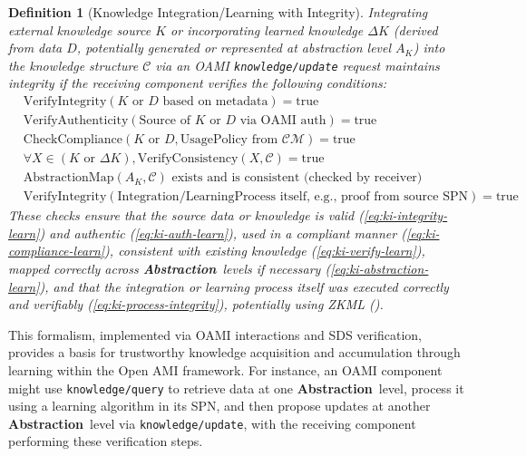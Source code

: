 \documentclass[12pt,a4paper]{report}
\renewcommand{\citep}[1]{\textit{\scriptsize{(\cite{#1})}}}
\newtheorem{definition}{Definition}[section]
\newcommand{\Abstraction}{\textbf{Abstraction}}
\begin{document}
	\begin{definition}[Knowledge Integration/Learning with Integrity]
		\label{def:knowledge_integration}
		Integrating external knowledge source $K$ or incorporating learned knowledge $\Delta K$ (derived from data $D$, potentially generated or represented at abstraction level $A_K$) into the knowledge structure $\mathcal{C}$ via an OAMI \texttt{knowledge/update} request maintains integrity if the receiving component verifies the following conditions:
		\begin{align}
			&\text{VerifyIntegrity}(K \text{ or } D \text{ based on metadata}) = \text{true} \label{eq:ki-integrity-learn}\\
			&\text{VerifyAuthenticity}(\text{Source of } K \text{ or } D \text{ via OAMI auth}) = \text{true} \label{eq:ki-auth-learn}\\
			&\text{CheckCompliance}(K \text{ or } D, \text{UsagePolicy from } \mathcal{CM}) = \text{true} \label{eq:ki-compliance-learn} \\
			&\forall X \in (K \text{ or } \Delta K), \text{VerifyConsistency}(X, \mathcal{C}) = \text{true} \label{eq:ki-verify-learn}\\
			&\text{AbstractionMap}(A_K, \mathcal{C}) \text{ exists and is consistent (checked by receiver)} \label{eq:ki-abstraction-learn}\\
			&\text{VerifyIntegrity}(\text{Integration/LearningProcess itself, e.g., proof from source SPN}) = \text{true} \label{eq:ki-process-integrity}
		\end{align}
		These checks ensure that the source data or knowledge is valid (\ref{eq:ki-integrity-learn}) and authentic (\ref{eq:ki-auth-learn}), used in a compliant manner (\ref{eq:ki-compliance-learn}), consistent with existing knowledge (\ref{eq:ki-verify-learn}), mapped correctly across \Abstraction\ levels if necessary (\ref{eq:ki-abstraction-learn}), and that the integration or learning process itself was executed correctly and verifiably (\ref{eq:ki-process-integrity}), potentially using ZKML \citep{Peng2025ZKMLSurvey}.
	\end{definition}
	
	This formalism, implemented via OAMI interactions and SDS verification, provides a basis for trustworthy knowledge acquisition and accumulation through learning within the Open AMI framework. For instance, an OAMI component might use \texttt{knowledge/query} to retrieve data at one \Abstraction\ level, process it using a learning algorithm in its SPN, and then propose updates at another \Abstraction\ level via \texttt{knowledge/update}, with the receiving component performing these verification steps.
	
\end{document}
